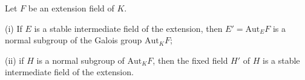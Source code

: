 Let $F$ be an extension field of $K$.

(i) If $E$ is a stable intermediate field of the extension, then $E' = \mathrm{Aut}_E F$ is a normal subgroup of the Galois group $\mathrm{Aut}_K F$;

(ii) if $H$ is a normal subgroup of $\mathrm{Aut}_K F$, then the fixed field $H'$ of $H$ is a stable intermediate field of the extension.
